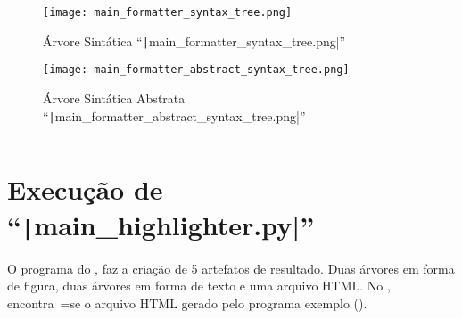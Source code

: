\begin{figure}[!htb]
\caption[Árvore Sintática ``main\_formatter\_syntax\_tree.png'']{Árvore Sintática ``\texttt|main_formatter_syntax_tree.png|''}
\label{figure:MainFormatterSyntaxTree}
\centering
\texttt{[image: main\_formatter\_syntax\_tree.png]}
\end{figure}

\begin{figure}[!htb]
\caption[Árvore Sintática Abstrata ``main\_formatter\_abstract\_syntax\_tree.png'']{Árvore Sintática Abstrata ``\texttt|main_formatter_abstract_syntax_tree.png|''}
\label{figure:MainFormatterAbstractSyntaxTree}
\centering
\texttt{[image: main\_formatter\_abstract\_syntax\_tree.png]}
\end{figure}

\begin{code}
\caption[Resultado da execução do arquivo ``source/main\_formatter.py'']{Resultado da execução do arquivo ``\texttt|source/main_formatter.py|''}
\label{code:MainFormatterPyResult}
\inputminted{text}{aftertext/main_formatter_output.txt}
\end{code}


\chapter[main\_highlighter.py]{Execução de ``\texttt|main_highlighter.py|''}

O programa do ,
faz a criação de 5 artefatos de resultado.
Duas árvores em forma de figura,
duas árvores em forma de texto e
uma arquivo HTML.
No ,
encontra~=se o arquivo HTML gerado pelo programa exemplo ().

